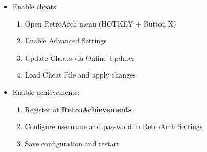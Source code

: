 \begin{enumerate}
\begin{itemize}
\item Enable cheats:
\begin{enumerate}
\item Open RetroArch menu (HOTKEY + Button X)
\item Enable Advanced Settings
\item Update Cheats via Online Updater
\item Load Cheat File and apply changes
\end{enumerate}

\item Enable achievements:
\begin{enumerate}
\item Register at \href{https://retroachievements.org}{\textbf{\color{blue}RetroAchievements}}
\item Configure username and password in RetroArch Settings
\item Save configuration and restart
\end{enumerate}

\end{itemize}

\end{enumerate}


